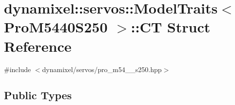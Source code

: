 \hypertarget{structdynamixel_1_1servos_1_1_model_traits_3_01_pro_m5440_s250_01_4_1_1_c_t}{}\section{dynamixel\+:\+:servos\+:\+:Model\+Traits$<$ Pro\+M5440\+S250 $>$\+:\+:C\+T Struct Reference}
\label{structdynamixel_1_1servos_1_1_model_traits_3_01_pro_m5440_s250_01_4_1_1_c_t}


{\ttfamily \#include $<$dynamixel/servos/pro\+\_\+m54\+\_\+\_\+s250.\+hpp$>$}

\subsection*{Public Types}
